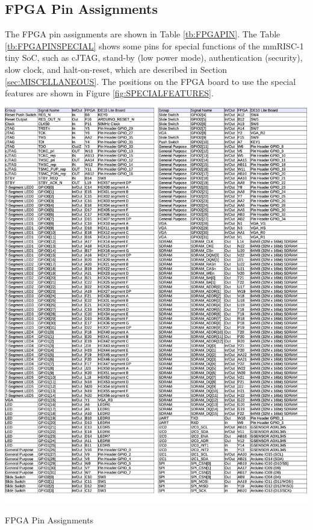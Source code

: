 \subsection{FPGA Pin Assignments}

The FPGA pin assignments are shown in Table \ref{tb:FPGAPIN}. The Table \ref{tb:FPGAPINSPECIAL} shows some pins for special functions of the mmRISC-1 tiny SoC, such as cJTAG, stand-by (low power mode), authentication (security), slow clock, and halt-on-reset, which are described in Section \ref{sec:MISCELLANEOUS}. The positions on the FPGA board to use the special features are shown in Figure \ref{fig:SPECIALFEATURES}.


\begin{table}[H]
    \includegraphics[width=1.0\columnwidth]{./Table/FPGAPinAssign.png}
    \caption{FPGA Pin Assignments}
    \label{tb:FPGAPIN}
\end{table}


